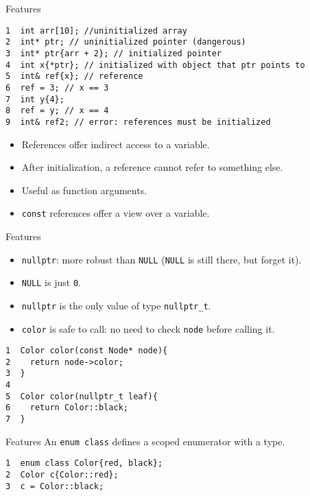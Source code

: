 \documentclass[presentation]{beamer}
\begin{document}
\begin{frame}[label={sec:org4abdff7},fragile]{Features}
 \begin{verbatim}
1  int arr[10]; //uninitialized array
2  int* ptr; // uninitialized pointer (dangerous)
3  int* ptr{arr + 2}; // initialized pointer
4  int x{*ptr}; // initialized with object that ptr points to
5  int& ref{x}; // reference
6  ref = 3; // x == 3
7  int y{4};
8  ref = y; // x == 4
9  int& ref2; // error: references must be initialized
\end{verbatim}

\begin{itemize}
\item References offer indirect access to a variable.
\item After initialization, a reference cannot refer to something else.
\item Useful as function arguments.
\item \texttt{const} references offer a view over a variable.
\end{itemize}
\end{frame}

\begin{frame}[label={sec:orgb0c6f70},fragile]{Features}
 \begin{itemize}
\item \texttt{nullptr}: more robust than \texttt{NULL} (\texttt{NULL} is still there, but
forget it).
\item \texttt{NULL} is just \texttt{0}.
\item \texttt{nullptr} is the only value of type \texttt{nullptr\_t}.
\item \texttt{color} is safe to call: no need to check \texttt{node} before calling
it.
\end{itemize}

\begin{verbatim}
1  Color color(const Node* node){
2    return node->color;
3  }
4  
5  Color color(nullptr_t leaf){
6    return Color::black;
7  }
\end{verbatim}
\end{frame}

\begin{frame}[label={sec:orgdd1f617},fragile]{Features}
 An \texttt{enum class} defines a scoped enumerator with a type.

\begin{verbatim}
1  enum class Color{red, black};
2  Color c{Color::red};
3  c = Color::black;
\end{verbatim}
\end{frame}
\end{document}
